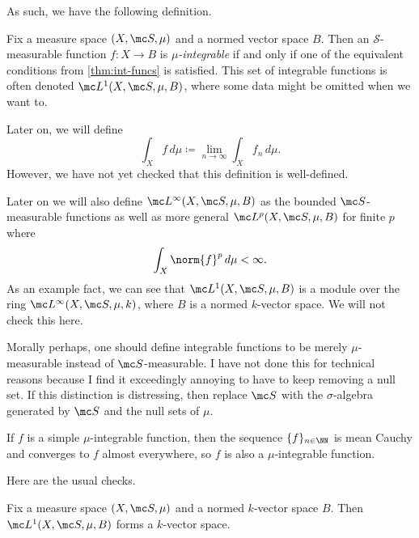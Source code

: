 \documentclass[../notes.tex]{subfiles}
\begin{document}
As such, we have the following definition.
\begin{definition}[Integrable]
	Fix a measure space $(X,\mc S,\mu)$ and a normed vector space $B$. Then an $\mathcal S$-measurable function $f\colon X\to B$ is \textit{$\mu$-integrable} if and only if one of the equivalent conditions from \autoref{thm:int-funcs} is satisfied. This set of integrable functions is often denoted $\mc L^1(X,\mc S,\mu,B)$, where some data might be omitted when we want to.
\end{definition}
\begin{remark}
	Later on, we will define
	\[\int_X f\,d\mu\coloneqq\lim_{n\to\infty}\int_Xf_n\,d\mu.\]
	However, we have not yet checked that this definition is well-defined.
\end{remark}
\begin{remark}
	Later on we will also define $\mc L^\infty(X,\mc S,\mu,B)$ as the bounded $\mc S$-measurable functions as well as more general $\mc L^p(X,\mc S,\mu,B)$ for finite $p$ where
	\[\int_X\norm{f}^p\,d\mu<\infty.\]
	As an example fact, we can see that $\mc L^1(X,\mc S,\mu,B)$ is a module over the ring $\mc L^\infty(X,\mc S,\mu,k)$, where $B$ is a normed $k$-vector space. We will not check this here.
\end{remark}
\begin{remark}
	Morally perhaps, one should define integrable functions to be merely $\mu$-measurable instead of $\mc S$-measurable. I have not done this for technical reasons because I find it exceedingly annoying to have to keep removing a null set. If this distinction is distressing, then replace $\mc S$ with the $\sigma$-algebra generated by $\mc S$ and the null sets of $\mu$.
\end{remark}
\begin{example} \label{ex:simple-int-is-int}
	If $f$ is a simple $\mu$-integrable function, then the sequence $\{f\}_{n\in\NN}$ is mean Cauchy and converges to $f$ almost everywhere, so $f$ is also a $\mu$-integrable function.
\end{example}
Here are the usual checks.
\begin{lemma} \label{lem:int-is-vec-space}
	Fix a measure space $(X,\mc S,\mu)$ and a normed $k$-vector space $B$. Then $\mc L^1(X,\mc S,\mu,B)$ forms a $k$-vector space.
\end{lemma}
\end{document}
